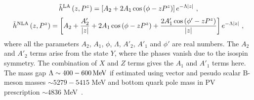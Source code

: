 \documentclass[a4paper,11pt]{article}
\begin{document}
\begin{align}
\tilde{h}^{\rm LA}\left(z,P^z\right) = 
\left[ A_2 + 2 A_1 \cos\left(\phi-z P^z\right) \right]e^{-\Lambda |z|}  \ ,
\end{align}
\begin{align}
\tilde{h}^{\rm NLA}\left(z,P^z\right) 
= \left[ A_{2} + \frac{A'_2}{|z|} + 2 A_1 \cos\left(\phi-z P^z\right) + \frac{2 A'_1  \cos\left(\phi'-z P^z\right)}{|z|} \right] e^{-\Lambda |z|} \ ,
\end{align}    
where all the parameters $A_2$, $A_1$, $\phi$, $\Lambda$, $A'_2$, $A'_1$ and $\phi'$ are real numbers. The $A_2$ and $A'_2$ terms arise from the state $Y$, where the phases vanish due to the isospin symmetry. The combination of $X$ and $Z$ terms gives the $A_1$ and $A'_1$ terms here. The mass gap $\Lambda \sim 400-600 \, {\rm MeV}$ if estimated using vector and pesudo scalar B-meson masses $\sim5279-5415$ MeV and bottom quark pole mass in PV prescription $\sim4836$ MeV~\cite{Ayala:2019hkn}. 
\end{document}
